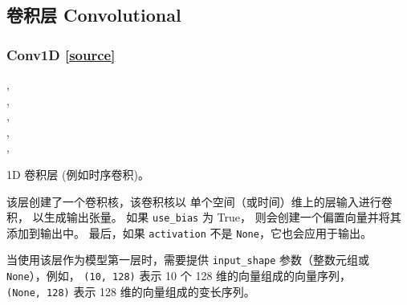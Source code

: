 \subsection{卷积层 Convolutional}
    
\subsubsection{Conv1D {\href{https://github.com/keras-team/keras/blob/master/keras/layers/convolutional.py\#L237}{{[}source{]}}}}

\begin{Shaded}
\begin{Highlighting}[]
\OperatorTok{=}, \\
\hspace{3cm}\OperatorTok{=}\OperatorTok{=}\OperatorTok{=}, \\
\hspace{3cm}\OperatorTok{=}\OperatorTok{=}, \\
\hspace{3cm}\OperatorTok{=}\OperatorTok{=}, \\
\hspace{3cm}\OperatorTok{=}\OperatorTok{=}, \\
\hspace{3cm}\OperatorTok{=}\OperatorTok{=}\NormalTok{)}
\end{Highlighting}
\end{Shaded}

1D 卷积层 (例如时序卷积)。

该层创建了一个卷积核，该卷积核以
单个空间（或时间）维上的层输入进行卷积， 以生成输出张量。 如果
\texttt{use\_bias} 为 True， 则会创建一个偏置向量并将其添加到输出中。
最后，如果 \texttt{activation} 不是 \texttt{None}，它也会应用于输出。

当使用该层作为模型第一层时，需要提供 \texttt{input\_shape}
参数（整数元组或 \texttt{None}），例如， \texttt{(10,\ 128)} 表示 10 个
128 维的向量组成的向量序列， \texttt{(None,\ 128)} 表示 128
维的向量组成的变长序列。

